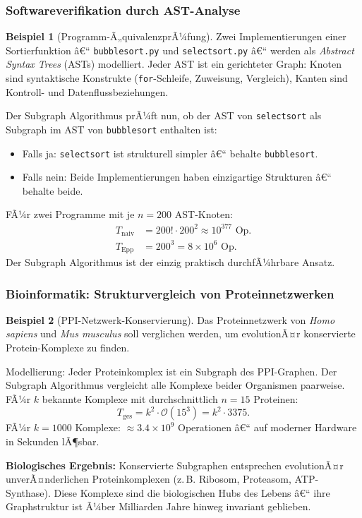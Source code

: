 ﻿\documentclass[12pt,a4paper,twoside]{article}
\theoremstyle{definition}
\newtheorem{beispiel}{Beispiel}[section]
\theoremstyle{plain}
\theoremstyle{remark}
\begin{document}
\subsubsection{Softwareverifikation durch AST-Analyse}

\begin{beispiel}[Programm-Ã„quivalenzprÃ¼fung]
Zwei Implementierungen einer Sortierfunktion â€“
\texttt{bubblesort.py} und \texttt{selectsort.py} â€“
werden als \emph{Abstract Syntax Trees} (ASTs)
modelliert.  Jeder AST ist ein gerichteter Graph:
Knoten sind syntaktische Konstrukte
(\texttt{for}-Schleife, Zuweisung, Vergleich),
Kanten sind Kontroll- und Datenflussbeziehungen.

Der Subgraph Algorithmus prÃ¼ft nun, ob der AST
von \texttt{selectsort} als Subgraph im AST von
\texttt{bubblesort} enthalten ist:
\begin{itemize}
  \item Falls ja: \texttt{selectsort} ist strukturell
        simpler â€“ behalte \texttt{bubblesort}.
  \item Falls nein: Beide Implementierungen haben
        einzigartige Strukturen â€“ behalte beide.
\end{itemize}
FÃ¼r zwei Programme mit je $n = 200$ AST-Knoten:
\begin{align*}
  T_{\text{naiv}} &= 200! \cdot 200^2 \approx 10^{377}\text{ Op.} \\
  T_{\text{Epp}}  &= 200^3 = 8 \times 10^6\text{ Op.}
\end{align*}
Der Subgraph Algorithmus ist der einzig praktisch
durchfÃ¼hrbare Ansatz.
\end{beispiel}

\subsubsection{Bioinformatik: Strukturvergleich von Proteinnetzwerken}

\begin{beispiel}[PPI-Netzwerk-Konservierung]
Das Proteinnetzwerk von \emph{Homo sapiens} und
\emph{Mus musculus} soll verglichen werden, um
evolutionÃ¤r konservierte Protein-Komplexe zu finden.

Modellierung: Jeder Proteinkomplex ist ein Subgraph
des PPI-Graphen.  Der Subgraph Algorithmus vergleicht
alle Komplexe beider Organismen paarweise.  FÃ¼r $k$
bekannte Komplexe mit durchschnittlich $n = 15$ Proteinen:
\[
  T_{\text{ges}} = k^2 \cdot \mathcal{O}(15^3)
                = k^2 \cdot 3375.
\]
FÃ¼r $k = 1000$ Komplexe: $\approx 3.4 \times 10^9$
Operationen â€“ auf moderner Hardware in Sekunden lÃ¶sbar.

\textbf{Biologisches Ergebnis:} Konservierte Subgraphen
entsprechen evolutionÃ¤r unverÃ¤nderlichen Proteinkomplexen
(z.\,B. Ribosom, Proteasom, ATP-Synthase).  Diese
Komplexe sind die biologischen Hubs des Lebens â€“
ihre Graphstruktur ist Ã¼ber Milliarden Jahre hinweg
invariant geblieben.
\end{beispiel}
\end{document}
